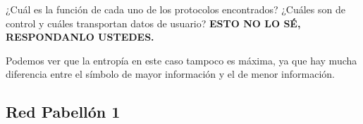 ¿Cuál es la función de cada uno de los protocolos encontrados? 
¿Cuáles son de control y cuáles transportan datos de usuario? 
\textbf{ESTO NO LO SÉ, RESPONDANLO USTEDES.}


Podemos ver que la entropía en este caso tampoco es máxima, ya que hay mucha 
diferencia entre el símbolo de mayor información y el de menor información.


\subsection{Red Pabellón 1}
